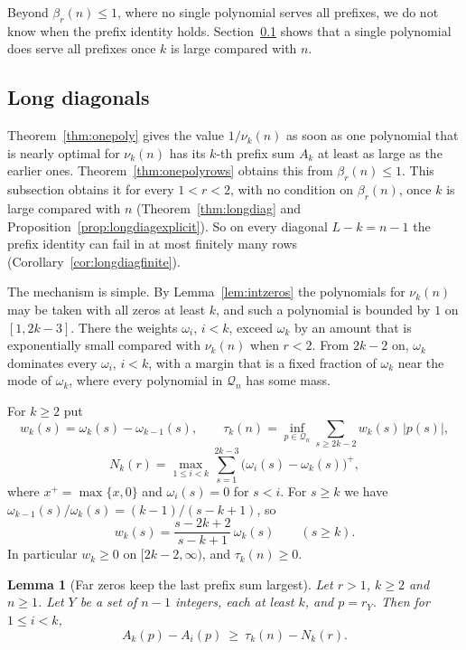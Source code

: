 \documentclass[11pt]{article}
\newtheorem{lemma}[theorem]{Lemma}
\begin{document}
Beyond $\beta_r(n)\le1$, where no single polynomial serves all prefixes,
we do not know when the prefix identity holds.  Section~\ref{sec:longdiag} shows that a
single polynomial does serve all prefixes once $k$ is large compared with
$n$.

\subsection{Long diagonals}\label{sec:longdiag}

Theorem~\ref{thm:onepoly} gives the value $1/\nu_k(n)$ as soon
as one polynomial that is nearly optimal for $\nu_k(n)$ has its $k$-th
prefix sum $A_k$ at least as large as the earlier ones.
Theorem~\ref{thm:onepolyrows} obtains this from $\beta_r(n)\le1$.  This
subsection obtains it for every $1<r<2$, with no condition on $\beta_r(n)$,
once $k$ is large compared with $n$ (Theorem~\ref{thm:longdiag} and
Proposition~\ref{prop:longdiagexplicit}).  So on every diagonal
$L-k=n-1$ the prefix identity can fail in at most finitely many rows
(Corollary~\ref{cor:longdiagfinite}).

The mechanism is simple.  By Lemma~\ref{lem:intzeros} the polynomials for
$\nu_k(n)$ may be taken with all zeros at least $k$, and such a polynomial is
bounded by $1$ on $[1,2k-3]$.  There the weights $\omega_i$, $i<k$, exceed
$\omega_k$ by an amount that is exponentially small compared with $\nu_k(n)$
when $r<2$.  From $2k-2$ on, $\omega_k$ dominates every $\omega_i$, $i<k$,
with a margin that is a fixed fraction of $\omega_k$ near the mode of
$\omega_k$, where every polynomial in $\mathcal Q_n$ has some mass.

For $k\ge2$ put
\[
  w_k(s)=\omega_k(s)-\omega_{k-1}(s),\qquad
  \tau_k(n)=\inf_{p\in\mathcal Q_n}\sum_{s\ge2k-2}w_k(s)\,|p(s)|,
\]
\[
  N_k(r)=\max_{1\le i<k}\sum_{s=1}^{2k-3}\bigl(\omega_i(s)-\omega_k(s)\bigr)^+,
\]
where $x^+=\max\{x,0\}$ and $\omega_i(s)=0$ for $s<i$.  For $s\ge k$ we have
$\omega_{k-1}(s)/\omega_k(s)=(k-1)/(s-k+1)$, so
\begin{equation}\label{eq:wkratio}
  w_k(s)=\frac{s-2k+2}{s-k+1}\,\omega_k(s)\qquad(s\ge k).
\end{equation}
In particular $w_k\ge0$ on $[2k-2,\infty)$, and $\tau_k(n)\ge0$.

\begin{lemma}[Far zeros keep the last prefix sum largest]\label{lem:farprefix}
Let $r>1$, $k\ge2$ and $n\ge1$.  Let $Y$ be a set of $n-1$ integers, each at
least $k$, and $p=r_Y$.  Then for $1\le i<k$,
\[
  A_k(p)-A_i(p)\ \ge\ \tau_k(n)-N_k(r).
\]
\end{lemma}
\end{document}
